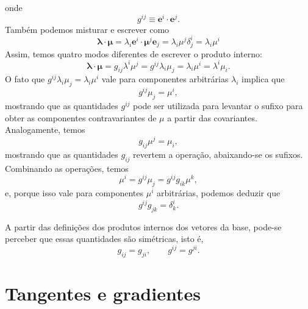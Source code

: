 onde
\begin{equation}\label{eq:DefinicaoTensorMetricaCovariante}
	\boxed{
		g^{i j} \equiv \mathbf{e}^{i} \cdot \mathbf{e}^{j}  .
	}
\end{equation}
Também podemos misturar e escrever como
\[
	\boldsymbol{\lambda} \cdot \boldsymbol{\mu}=\lambda_{i} \mathbf{e}^{i} \cdot \boldsymbol{\mu}^{j} \mathbf{e}_{j}=\lambda_{i} \mu^{j} \delta_{j}^{i}=\lambda_{i} \mu^{i}
\]
Assim, temos quatro modos diferentes de escrever o produto interno:
\begin{equation}\label{eq:ProdutoInterno}
	\boxed{
		\boldsymbol{\lambda} \cdot \boldsymbol{\mu}=g_{ij}\lambda^i\mu^j = g^{ij}\lambda_i\mu_j = \lambda_i\mu^i = \lambda^i\mu_i .
	}
\end{equation}
O fato que $g^{ij}\lambda_i\mu_j=\lambda_i\mu^i$ vale para componentes arbitrárias $\lambda_i$ implica que 
\begin{equation}\label{eq:LevantamentoIndice}
	g^{ij}\mu_j=\mu^i ,
\end{equation}
mostrando que as quantidades $g^{ij}$ pode ser utilizada para levantar o sufixo para obter as componentes contravariantes de $\mu$ a partir das covariantes. Analogamente, temos 
\begin{equation}\label{eq:AbaixamentoIndice}
	g_{ij}\mu^j=\mu_i ,
\end{equation}
mostrando que as quantidades $g_{ij}$ revertem a operação, abaixando-se os sufixos. Combinando as operações, temos
\[
	\mu^i = g^{ij}\mu_j=g^{ij}g_{ik}\mu^k ,
\]
e, porque isso vale para componentes $\mu^i$ arbitrárias, podemos deduzir que
\begin{equation}
	\boxed{
		g^{ij}g_{jk}=\delta^i_k   .
	}
\end{equation}

A partir das definições dos produtos internos dos vetores da base, pode-se perceber que essas quantidades são simétricas, isto é,
\begin{equation}\label{eq:SimetriaTensorMetrica}
	g_{ij}=g_{ji}, \qquad g^{ij}=g^{ji} .
\end{equation}

\section{Tangentes e gradientes}\label{sec:TangentesGradientes}

